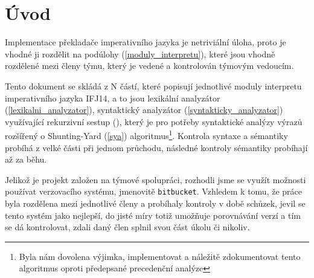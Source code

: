 \documentclass[12pt,a4paper,titlepage,final]{article}
\begin{document}

\def\author{xxx}
\def\email{xxx@stud.fit.vutbr.cz}
\def\projname{Implementace interpretu imperativního jazyka IFJ14}



\pagestyle{plain}
\setcounter{page}{1}
\tableofcontents

\newpage
\pagestyle{plain}
\setcounter{page}{1}

\section{Úvod} \label{uvod}
Implementace překladače imperativního jazyka je netriviální úloha, proto je
vhodné ji rozdělit na podúlohy (\ref{moduly_interpretu}), které jsou vhodně
rozdělené mezi členy týmu, který je vedené a kontrolován týmovým vedoucím.

Tento dokument se skládá z N částí, které popisují jednotlivé moduly
interpretu imperativního jazyka IFJ14, a to jsou lexikální analyzátor
(\ref{lexikalni_analyzator}), syntaktický analyzátor (\ref{syntakticky_analyzator})
využívající rekurzivní sestup (), který je pro potřeby syntaktické
analýzy výrazů rozšířený o Shunting-Yard (\ref{sya}) algoritmus\footnote{Byla nám
dovolena výjimka, implementovat a náležitě zdokumentovat tento algoritmus oproti předepsané
precedenční analýze}. Kontrola syntaxe a sémantiky probíhá z velké části při jednom
průchodu, následné kontroly sémantiky probíhají až za běhu.

Jelikož je projekt založen na týmové spolupráci, rozhodli jsme se využít možnosti používat verzovacího systému, jmenovitě \verb|bitbucket|. Vzhledem k tomu, že práce byla rozdělena mezi jednotlivé členy a probíhaly kontroly v době schůzek, jevil se tento systém jako nejlepší, do jisté míry totiž umožňuje porovnávání verzí a tím se dá kontrolovat, zdali daný člen splnil svou část úkolu či nikoliv.
\end{document}
